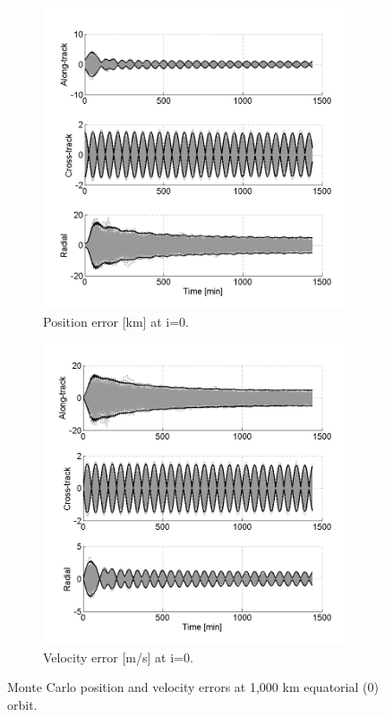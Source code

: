 \documentclass[]{aiaa-tc}%
\begin{document}
\begin{figure}[h!]
	\centering
	\begin{subfigure}{.49\textwidth}
		\centering
		\includegraphics{MC_pos0}
		\caption{Position error [km] at i=0\degree.}
		\label{fig:mcpos0}
	\end{subfigure}
	\begin{subfigure}{.49\textwidth} 
		\centering
		\includegraphics{MC_vel0}
		\caption{Velocity error [m/s] at i=0\degree.}
		\label{fig:coastline}
	\end{subfigure}
	\caption{Monte Carlo position and velocity errors at 1,000 km equatorial (0\degree) orbit.}
	\label{fig:mcvel0}
\end{figure}
\end{document}
